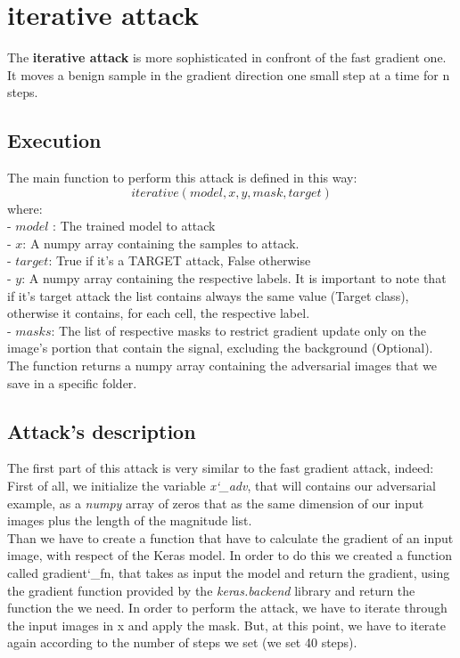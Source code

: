 \section{iterative attack}
The \textbf{iterative attack} is more sophisticated in confront of the fast gradient one. It moves a benign sample in the gradient direction one small step at a time for n steps.

\subsection{Execution}

The main function to perform this attack is defined in this way:
\[ iterative(model, x, y, mask, target) \]
where:\\
- $model$ : The trained model to attack\\
- $x$: A numpy array containing the samples to attack.\\
- $target$: True if it's a TARGET attack, False otherwise\\
- $y$: A numpy array containing the respective labels. It is important to note that if it's target attack the list contains always the same value (Target class), otherwise it contains, for each cell, the respective label. \\
- $masks$: The list of respective masks to restrict gradient update only on the image’s portion that contain the signal, excluding the background (Optional).\\
\newline
The function returns a numpy array containing the adversarial images that we save in a specific folder.

\subsection{Attack's description}
The first part of this attack is very similar to the fast gradient attack, indeed: First of all, we initialize the variable \textit{x\char`_adv}, that will contains our adversarial example, as a \textit{numpy} array of zeros that as the same dimension of our input images plus the length of the magnitude list.\\
\newline
Than we have to create a function that have to calculate the gradient of an input image, with respect of the Keras model. In order to do this we created a function called gradient\char`_fn, that takes as input the model and return the gradient, using the gradient function provided by the \textit{keras.backend} library and return the function the we need. In order to perform the attack, we have to iterate through the input images in x and apply the mask.
But, at this point, we have to iterate again according to the number of steps we set (we set 40 steps).

